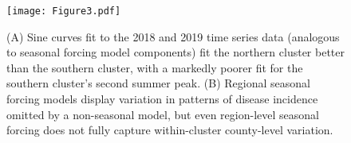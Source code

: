 \documentclass{article}
\begin{document}

\begin{figure}
    \centering
    \texttt{[image: Figure3.pdf]}
    \caption{(A) Sine curves fit to the 2018 and 2019 time series data (analogous to seasonal forcing model components) fit the northern cluster better than the southern cluster, with a markedly poorer fit for the southern cluster's second summer peak.  (B) Regional seasonal forcing models display variation in patterns of disease incidence omitted by a non-seasonal model, but even region-level seasonal forcing does not fully capture within-cluster county-level variation.}
    \label{fig:sinfit}
\end{figure}
\end{document}
